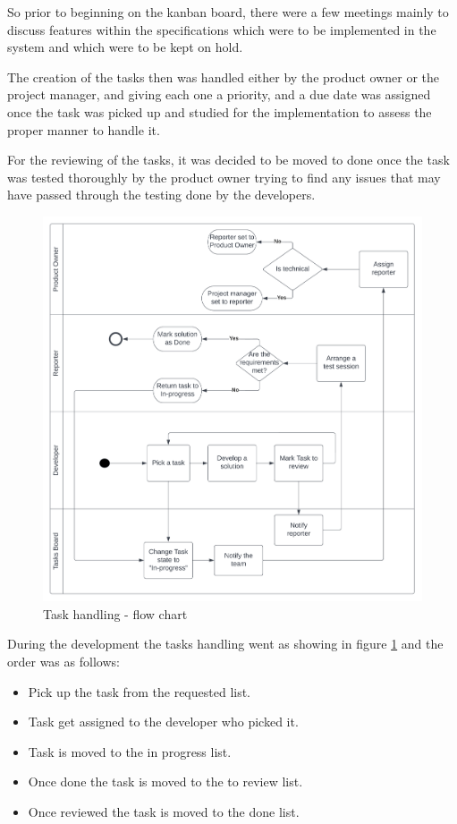 So prior to beginning on the kanban board, there were a few meetings 
mainly to discuss features within the specifications which were to be implemented 
in the system and which were to be kept on hold.

The creation of the tasks then was handled either by the product owner or the project
manager, and giving each one a priority, and a due date was assigned once the task was
picked up and studied for the implementation to assess the proper manner to handle it.

For the reviewing of the tasks, it was decided to be moved to done once the task was
tested thoroughly by the product owner trying to find any issues that may have
passed through the testing done by the developers.

\begin{figure}[!ht]
    \centering
    \includegraphics[width=\textwidth]{images/task handling flow.png}
    \caption{\footnotesize{Task handling - flow chart}}
    \label{fig:task_handling}
\end{figure}

During the development the tasks handling went as showing in figure \ref{fig:task_handling}
and the order was as follows:
    \begin{itemize}
        \item Pick up the task from the requested list.
        \item Task get assigned to the developer who picked it.
        \item Task is moved to the in progress list.
        \item Once done the task is moved to the to review list.
        \item Once reviewed the task is moved to the done list.
    \end{itemize}

